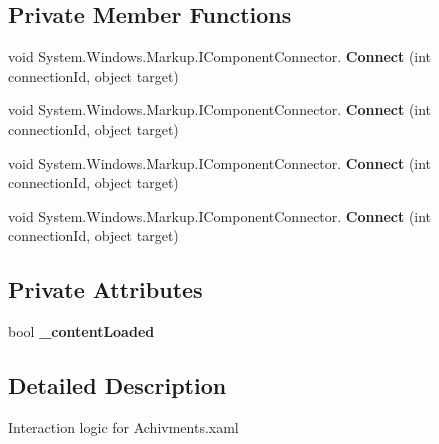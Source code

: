 \subsection*{Private Member Functions}
\begin{DoxyCompactItemize}
\item 
\mbox{\label{class_t_h_b___plugin___social_1_1_achivments_1_1_page_a36b7ab5db99c6b887a85373e73ad2dce}} 
void System.\+Windows.\+Markup.\+I\+Component\+Connector. {\bfseries Connect} (int connection\+Id, object target)
\item 
\mbox{\label{class_t_h_b___plugin___social_1_1_achivments_1_1_page_a36b7ab5db99c6b887a85373e73ad2dce}} 
void System.\+Windows.\+Markup.\+I\+Component\+Connector. {\bfseries Connect} (int connection\+Id, object target)
\item 
\mbox{\label{class_t_h_b___plugin___social_1_1_achivments_1_1_page_a36b7ab5db99c6b887a85373e73ad2dce}} 
void System.\+Windows.\+Markup.\+I\+Component\+Connector. {\bfseries Connect} (int connection\+Id, object target)
\item 
\mbox{\label{class_t_h_b___plugin___social_1_1_achivments_1_1_page_a36b7ab5db99c6b887a85373e73ad2dce}} 
void System.\+Windows.\+Markup.\+I\+Component\+Connector. {\bfseries Connect} (int connection\+Id, object target)
\end{DoxyCompactItemize}
\subsection*{Private Attributes}
\begin{DoxyCompactItemize}
\item 
\mbox{\label{class_t_h_b___plugin___social_1_1_achivments_1_1_page_a3f6d68f488880b21b4e75f431370e6f9}} 
bool {\bfseries \+\_\+content\+Loaded}
\end{DoxyCompactItemize}


\subsection{Detailed Description}
Interaction logic for Achivments.\+xaml 

